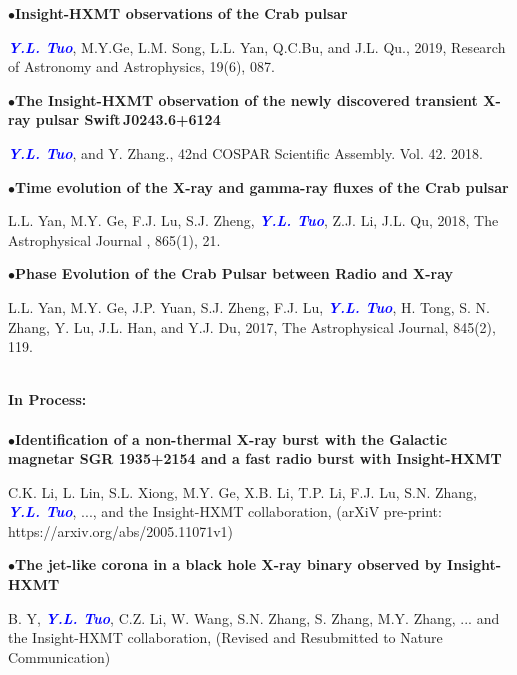 \documentclass[a4paper,12pt]{article}
\newcommand{\pubbullet}{$\bullet$\hspace{0.4cm}}
\newcommand{\me}{\textcolor{blue}{\textit{\textbf{Y.L. Tuo}}}}
\begin{document}
\pubbullet{}\textbf{Insight-HXMT observations of the Crab pulsar}
\begin{description}
\item \textcolor{blue}{\textit{\textbf{Y.L. Tuo}}}, M.Y.Ge, L.M. Song, L.L. Yan, Q.C.Bu, and J.L. Qu., 2019, Research of Astronomy and Astrophysics, 19(6), 087. 
\end{description}

\pubbullet{}\textbf{The Insight-HXMT observation of the newly discovered transient X-ray pulsar Swift\,J0243.6+6124}
\begin{description}
  \item \textcolor{blue}{\textit{\textbf{Y.L. Tuo}}}, and Y. Zhang., 42nd COSPAR Scientific Assembly. Vol. 42. 2018.
\end{description}

\pubbullet{}\textbf{Time evolution of the X-ray and gamma-ray fluxes of the Crab pulsar}
\begin{description}
\item L.L. Yan, M.Y. Ge, F.J. Lu, S.J. Zheng, \textcolor{blue}{\textit{\textbf{Y.L. Tuo}}}, Z.J. Li, J.L. Qu, 2018, The Astrophysical Journal , 865(1), 21.
\end{description}

\pubbullet{}\textbf{Phase Evolution of the Crab Pulsar between Radio and X-ray}
\begin{description}
  \item L.L. Yan, M.Y. Ge, J.P. Yuan, S.J. Zheng, F.J. Lu, \me{}, H. Tong, S. N. Zhang, Y. Lu, J.L. Han, and Y.J. Du, 2017, The Astrophysical Journal, 845(2), 119.
\end{description}

\hspace{2cm}\\
\textbf{In Process:}\\
\noindent\makebox[0.5\linewidth]{\rule{0.5\textwidth}{1pt}} \\
\pubbullet{}\textbf{Identification of a non-thermal X-ray burst with the Galactic magnetar SGR 1935+2154 and a fast radio burst with Insight-HXMT}
\begin{description}
  \item C.K. Li, L. Lin, S.L. Xiong, M.Y. Ge, X.B. Li, T.P. Li, F.J. Lu, S.N. Zhang, \me{}, ..., and the Insight-HXMT collaboration, (arXiV pre-print: https://arxiv.org/abs/2005.11071v1)
\end{description}

\pubbullet{}\textbf{The jet-like corona in a black hole X-ray binary observed by Insight-HXMT}
\begin{description}
  \item B. Y, \me{}, C.Z. Li, W. Wang, S.N. Zhang, S. Zhang, M.Y. Zhang, ... and the Insight-HXMT collaboration, (Revised and Resubmitted to Nature Communication)
\end{description}
\end{document}
